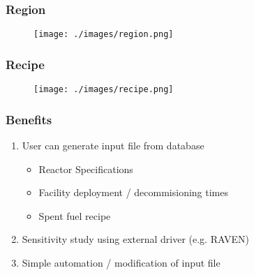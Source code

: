 \begin{frame}
    \frametitle{Region}
\begin{figure}[htbp!]
        \begin{center}
                \texttt{[image: ./images/region.png]}
        \end{center}
    \end{figure}

\end{frame}

\begin{frame}
    \frametitle{Recipe}
\begin{figure}[htbp!]
        \begin{center}
                \texttt{[image: ./images/recipe.png]}
        \end{center}
    \end{figure}
\end{frame}


\begin{frame}
    \frametitle{Benefits}
    \begin{enumerate}
        \item User can generate input file from database
        \begin{itemize}
            \item Reactor Specifications
            \item Facility deployment / decommisioning times
            \item Spent fuel recipe
        \end{itemize}
        \item Sensitivity study using external driver (e.g. RAVEN)
        \item Simple automation / modification of input file
    \end{enumerate}
\end{frame}

